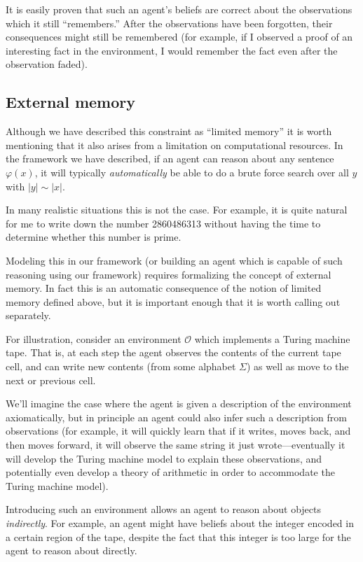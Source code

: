 \documentclass[12pt]{article}
\theoremstyle{definition}
\renewcommand{\O}{\mathcal{O}}
\newcommand{\of}[1]{\left(#1\right)}
\newcommand{\vp}{\varphi}
\newcommand{\abs}[1]{\left\vert#1\right\vert}
\begin{document}
It is easily proven that such an agent's beliefs are correct
about the observations
which it still ``remembers.'' 
After the observations have been forgotten, their consequences
might still be remembered (for example, if I observed a proof of an interesting
fact in the environment, I would remember the fact even after the observation faded).

\subsection{External memory}\label{external-memory}

Although we have described this constraint as ``limited memory'' it is worth mentioning
that it also arises from a limitation on computational resources.
In the framework we have described, if an agent can reason about any sentence
$\vp\of{x}$, it will typically \emph{automatically} be able to do a brute force
search over all $y$ with $\abs{y}\sim\abs{x}$.

In many realistic situations this is not the case. For example, 
it is quite natural for me to write down the number
2860486313
without having the time to determine whether this number is prime.

Modeling this in our framework (or building an agent which is capable
of such reasoning using our framework) requires formalizing the concept of external memory.
In fact this is an automatic consequence of the notion of limited memory defined above,
but it is important enough that it is worth calling out separately.

For illustration, consider an environment $\O$
which implements a Turing machine tape.
That is, at each step the agent observes the contents
of the current tape cell,
and can write new contents (from some alphabet $\Sigma$)
as well as move to the next or previous cell.

We'll imagine the case where the agent is given a description
of the environment axiomatically, but in principle an agent
could also infer such a description from observations
(for example, it will quickly learn that if it writes, moves back,
and then moves forward, it will observe the same string it just wrote---eventually
it will develop the Turing machine model to explain these observations,
and potentially even develop a theory of arithmetic in order to accommodate
the Turing machine model).

Introducing such an environment allows an agent to reason about
objects \emph{indirectly}.
For example, an agent might have beliefs about the integer
encoded in a certain region of the tape,
despite the fact that this integer is too large for the agent
to reason about directly.
\end{document}
